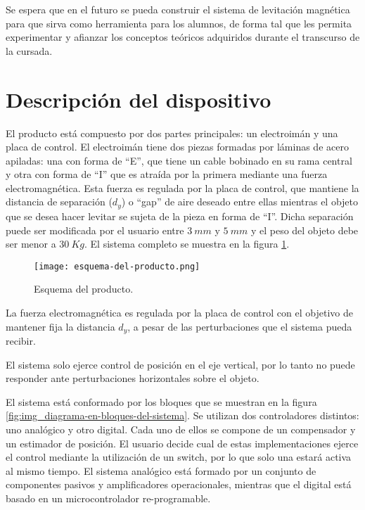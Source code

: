 \noindent Se espera que en el futuro se pueda construir el sistema de levitación magnética para que sirva como herramienta para los alumnos, de forma tal que les permita experimentar y afianzar los conceptos teóricos adquiridos durante el transcurso de la cursada.



\section{Descripción del dispositivo}

\noindent El producto está compuesto por dos partes principales: un electroimán y una placa de control. El electroimán tiene dos piezas formadas por láminas de acero apiladas: una con forma de “E”, que tiene un cable bobinado en su rama central y otra con forma de “I” que es atraída por la primera mediante una fuerza electromagnética. Esta fuerza es regulada por la placa de control, que mantiene la distancia de separación ($d_y$) o “gap” de aire deseado entre ellas mientras el objeto que se desea hacer levitar se sujeta de la pieza en forma de “I”. Dicha separación puede ser modificada por el usuario entre $3\:mm$ y $5\:mm$ y el peso del objeto debe ser menor a $30\:Kg$. El sistema completo se muestra en la figura \ref{fig:img_Esquema-del-producto}.

\begin{figure}[H]
	\centering
	\texttt{[image: esquema-del-producto.png]}
	\caption{Esquema del producto.}
	\label{fig:img_Esquema-del-producto}
\end{figure}

\noindent La fuerza electromagnética es regulada por la placa de control con el objetivo de mantener fija la distancia $d_{y}$, a pesar de las perturbaciones que el sistema pueda recibir. 


\noindent El sistema solo ejerce control de posición en el eje vertical, por lo tanto no puede responder ante perturbaciones horizontales sobre el objeto.


\noindent El sistema está conformado por los bloques que se muestran en la figura \ref{fig:img_diagrama-en-bloques-del-sistema}. Se utilizan dos controladores distintos: uno analógico y otro digital. Cada uno de ellos se compone de un compensador y un estimador de posición.  El usuario decide cual de estas implementaciones ejerce el control mediante la utilización de un switch, por lo que solo una estará activa al mismo tiempo. El sistema analógico está formado por un conjunto de componentes pasivos y amplificadores operacionales, mientras que el digital está basado en un microcontrolador re-programable.

